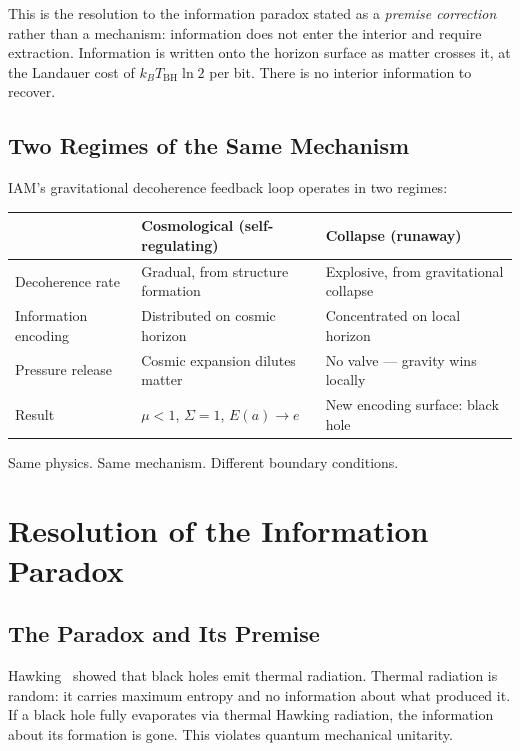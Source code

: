 \documentclass[12pt,letterpaper]{article}
\begin{document}
This is the resolution to the information paradox stated as
a \emph{premise correction} rather than a mechanism:
information does not enter the interior and require extraction.
Information is written onto the horizon surface as matter crosses it,
at the Landauer cost of $k_B T_\text{BH}\ln 2$ per bit.
There is no interior information to recover.

\subsection{Two Regimes of the Same Mechanism}

IAM's gravitational decoherence feedback loop operates in two regimes:

\smallskip
\begin{center}
\begin{tabular}{p{}p{}p{}}
\toprule
& \textbf{Cosmological (self-regulating)} & \textbf{Collapse (runaway)} \\
\midrule
Decoherence rate & Gradual, from structure formation & Explosive, from gravitational collapse \\
Information encoding & Distributed on cosmic horizon & Concentrated on local horizon \\
Pressure release & Cosmic expansion dilutes matter & No valve --- gravity wins locally \\
Result & $\mu < 1$, $\Sigma = 1$, $E(a)\to e$ & New encoding surface: black hole \\
\bottomrule
\end{tabular}
\end{center}
\smallskip

Same physics. Same mechanism. Different boundary conditions.

\section{Resolution of the Information Paradox}

\subsection{The Paradox and Its Premise}

Hawking~\cite{Hawking1975} showed that black holes emit thermal radiation.
Thermal radiation is random: it carries maximum entropy and no
information about what produced it. If a black hole fully evaporates
via thermal Hawking radiation, the information about its formation
is gone. This violates quantum mechanical unitarity.
\end{document}
